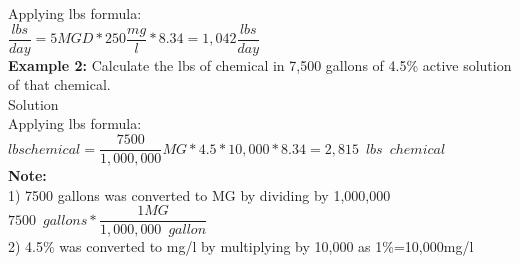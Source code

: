 \documentclass{article}
\begin{document}
Applying lbs formula:\\
$\dfrac{lbs}{day}=5 MGD *250\dfrac{mg}{l}*8.34 = \boxed{1,042\dfrac{lbs}{day}}$
\\
\vspace{6pt}
\textbf{Example 2:} Calculate the lbs of chemical in 7,500 gallons of 4.5\% active solution of that chemical.\\
Solution\\
Applying lbs formula:\\
$lbs chemical = \dfrac{7500}{1,000,000}MG * 4.5*10,000 *8.34 = \boxed{2,815 \enspace lbs \enspace chemical}$\\
\textbf{Note:}\\  
1) 7500 gallons was converted to MG by dividing by 1,000,000\\
$7500 \enspace gallons * \dfrac{1 MG}{1,000,000 \enspace gallon}$\\
2) 4.5\% was converted to mg/l by multiplying by 10,000 as 1\%=10,000mg/l








\end{document}
